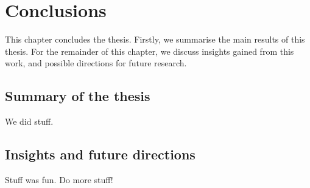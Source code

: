 \chapter{Conclusions}
\label{chapterConclusions}


This chapter concludes the thesis.
Firstly, we summarise the main results of this thesis.
For the remainder of this chapter, we discuss insights gained from this work, and possible directions for future research.

\section{Summary of the thesis}

We did stuff.

\section{Insights and future directions}

Stuff was fun. Do more stuff!